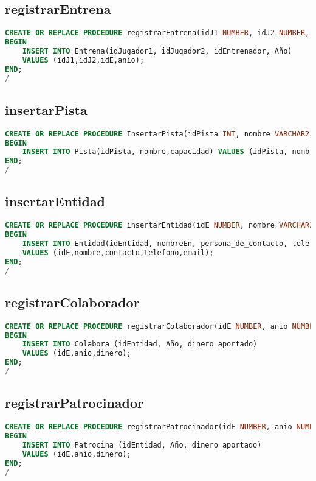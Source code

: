 \subsection{registrarEntrena}
\begin{lstlisting}[language=sql]
CREATE OR REPLACE PROCEDURE registrarEntrena(idJ1 NUMBER, idJ2 NUMBER, idE NUMBER, anio NUMBER) AS
BEGIN
    INSERT INTO Entrena(idJugador1, idJugador2, idEntrenador, Año)
    VALUES (idJ1,idJ2,idE,anio);
END;
/
\end{lstlisting}

\subsection{insertarPista}
\begin{lstlisting}[language=sql]
CREATE OR REPLACE PROCEDURE InsertarPista(idPista INT, nombre VARCHAR2,capacidad INT) IS
BEGIN
    INSERT INTO Pista(idPista, nombre,capacidad) VALUES (idPista, nombre,capacidad);
END;
/
\end{lstlisting}

\subsection{insertarEntidad}
\begin{lstlisting}[language=sql]
CREATE OR REPLACE PROCEDURE insertarEntidad(idE NUMBER, nombre VARCHAR2, contacto VARCHAR2, telefono NUMBER, email VARCHAR2) AS
BEGIN
    INSERT INTO Entidad(idEntidad, nombreEn, persona_de_contacto, telefonoEn, emailEn)
    VALUES (idE,nombre,contacto,telefono,email);
END;
/
\end{lstlisting}

\subsection{registrarColaborador}
\begin{lstlisting}[language=sql]
CREATE OR REPLACE PROCEDURE registrarColaborador(idE NUMBER, anio NUMBER, dinero NUMBER) AS
BEGIN
    INSERT INTO Colabora (idEntidad, Año, dinero_aportado)
    VALUES (idE,anio,dinero);
END;
/
\end{lstlisting}
\pagebreak
\subsection{registrarPatrocinador}
\begin{lstlisting}[language=sql]
CREATE OR REPLACE PROCEDURE registrarPatrocinador(idE NUMBER, anio NUMBER, dinero NUMBER) AS
BEGIN
    INSERT INTO Patrocina (idEntidad, Año, dinero_aportado)
    VALUES (idE,anio,dinero);
END;
/
\end{lstlisting}

